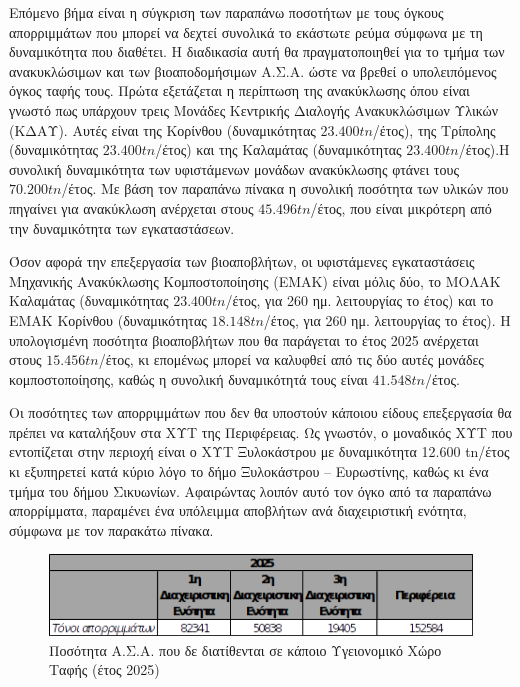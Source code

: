\documentclass[12pt]{article}
\begin{document}
	Επόμενο βήμα είναι η σύγκριση των παραπάνω ποσοτήτων με τους όγκους απορριμμάτων που μπορεί να δεχτεί συνολικά το εκάστωτε ρεύμα σύμφωνα με τη δυναμικότητα που διαθέτει. Η διαδικασία αυτή θα πραγματοποιηθεί για το τμήμα των ανακυκλώσιμων και των βιοαποδομήσιμων Α.Σ.Α. ώστε να βρεθεί ο υπολειπόμενος όγκος ταφής τους. Πρώτα εξετάζεται η περίπτωση της ανακύκλωσης όπου είναι γνωστό πως υπάρχουν τρεις Μονάδες Κεντρικής Διαλογής Ανακυκλώσιμων Υλικών (ΚΔΑΥ). Αυτές είναι της Κορίνθου (δυναμικότητας $23.400 tn$/έτος), της Τρίπολης (δυναμικότητας $23.400 tn$/έτος) και της Καλαμάτας (δυναμικότητας $23.400 tn$/έτος).Η συνολική δυναμικότητα των υφιστάμενων μονάδων ανακύκλωσης φτάνει τους $70.200 tn$/έτος. Με βάση τον παραπάνω πίνακα η συνολική ποσότητα των υλικών που πηγαίνει για ανακύκλωση ανέρχεται στους $45.496 tn$/έτος, που είναι μικρότερη από την δυναμικότητα των εγκαταστάσεων. 
	
	Όσον αφορά την επεξεργασία των βιοαποβλήτων, οι υφιστάμενες εγκαταστάσεις Μηχανικής Ανακύκλωσης Κομποστοποίησης (ΕΜΑΚ) είναι μόλις δύο, το ΜΟΛΑΚ Καλαμάτας (δυναμικότητας $23.400 tn$/έτος, για 260 ημ. λειτουργίας το έτος) και το ΕΜΑΚ Κορίνθου (δυναμικότητας $18.148 tn$/έτος, για 260 ημ. λειτουργίας το έτος). Η υπολογισμένη ποσότητα βιοαποβλήτων που θα παράγεται το έτος 2025 ανέρχεται στους $15.456 tn$/έτος, κι επομένως μπορεί να καλυφθεί από τις δύο αυτές μονάδες κομποστοποίησης, καθώς η συνολική δυναμικότητά τους είναι $41.548 tn$/έτος. 
	
	Οι ποσότητες των απορριμμάτων που δεν θα υποστούν κάποιου είδους επεξεργασία θα πρέπει να καταλήξουν στα ΧΥΤ της Περιφέρειας. Ως γνωστόν, ο μοναδικός ΧΥΤ που εντοπίζεται στην περιοχή είναι ο ΧΥΤ Ξυλοκάστρου με δυναμικότητα 12.600 tn/έτος κι εξυπηρετεί κατά κύριο λόγο το δήμο Ξυλοκάστρου – Ευρωστίνης, καθώς κι ένα τμήμα του δήμου Σικυωνίων. Αφαιρώντας λοιπόν αυτό τον όγκο από τα παραπάνω απορρίμματα, παραμένει ένα υπόλειμμα αποβλήτων ανά διαχειριστική ενότητα, σύμφωνα με τον παρακάτω πίνακα.
	
	\begin{figure} [H]
		\begin{center}
			\includegraphics [scale = 0.95] {table21.png}
			\caption{Ποσότητα Α.Σ.Α. που δε διατίθενται σε κάποιο Υγειονομικό Χώρο Ταφής (έτος 2025)}
		\end{center}
	\end{figure}
\end{document}
